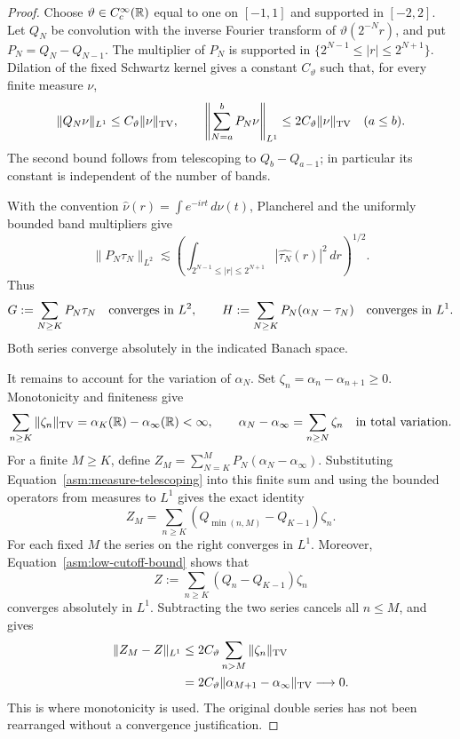 \begin{proof}
Choose $\vartheta\in C_c^\infty(\mathbb R)$ equal to one on $[-1,1]$ and
supported in $[-2,2]$.  Let $Q_N$ be convolution with the inverse
Fourier transform of $\vartheta(2^{-N}r)$, and put
$P_N=Q_N-Q_{N-1}$.  The multiplier of $P_N$ is supported in
$\{2^{N-1}\le|r|\le2^{N+1}\}$.  Dilation of the fixed Schwartz
kernel gives a constant $C_\vartheta$ such that, for every finite
measure $\nu$,
\begin{equation}
 \label{asm:low-cutoff-bound}
 \|Q_N\nu\|_{L^1}\le C_\vartheta\|\nu\|_{\mathrm{TV}},\qquad
 \left\|\sum_{N=a}^bP_N\nu\right\|_{L^1}
 \le2C_\vartheta\|\nu\|_{\mathrm{TV}}\quad(a\le b).
\end{equation}
The second bound follows from telescoping to $Q_b-Q_{a-1}$; in
particular its constant is independent of the number of bands.

With the convention $\widehat\nu(r)=\int e^{-irt}\,d\nu(t)$,
Plancherel \cite[equation~(12.4)]{Mattila1995} and the uniformly
bounded band multipliers give
\[
 \|P_N\tau_N\|_{L^2}
 \lesssim
 \left(\int_{2^{N-1}\le |r|\le2^{N+1}}
                   |\widehat{\tau_N}(r)|^2\,dr\right)^{1/2}.
\]
Thus
\begin{equation}
 \label{asm:two-convergent-series}
 G:=\sum_{N\ge K}P_N\tau_N\quad\hbox{converges in }L^2,
 \qquad
 H:=\sum_{N\ge K}P_N(\alpha_N-\tau_N)
                         \quad\hbox{converges in }L^1.
\end{equation}
Both series converge absolutely in the indicated Banach space.

It remains to account for the variation of $\alpha_N$.  Set
$\zeta_n=\alpha_n-\alpha_{n+1}\ge0$.  Monotonicity and finiteness
give
\begin{equation}
 \label{asm:measure-telescoping}
 \sum_{n\ge K}\|\zeta_n\|_{\mathrm{TV}}
       =\alpha_K(\mathbb R)-\alpha_\infty(\mathbb R)<\infty,
 \qquad
 \alpha_N-\alpha_\infty=\sum_{n\ge N}\zeta_n
                         \quad\hbox{in total variation}.
\end{equation}
For a finite $M\ge K$, define
$Z_M=\sum_{N=K}^MP_N(\alpha_N-\alpha_\infty)$.  Substituting
Equation~\eqref{asm:measure-telescoping} into this finite sum and
using the bounded operators from measures to $L^1$ gives the exact
identity
\begin{equation}
 \label{asm:finite-band-identity}
 Z_M=\sum_{n\ge K}
             (Q_{\min(n,M)}-Q_{K-1})\zeta_n.
\end{equation}
For each fixed $M$ the series on the right converges in $L^1$.
Moreover, Equation~\eqref{asm:low-cutoff-bound} shows that
\[
 Z:=\sum_{n\ge K}(Q_n-Q_{K-1})\zeta_n
\]
converges absolutely in $L^1$.  Subtracting the two series cancels
all $n\le M$, and gives
\begin{equation}
 \label{asm:variation-tail}
 \begin{split}
 \|Z_M-Z\|_{L^1}
 &\le2C_\vartheta\sum_{n>M}\|\zeta_n\|_{\mathrm{TV}}\\
 &=2C_\vartheta
             \|\alpha_{M+1}-\alpha_\infty\|_{\mathrm{TV}}
 \longrightarrow0.
 \end{split}
\end{equation}
This is where monotonicity is used.  The original double series has
not been rearranged without a convergence justification.


\end{proof}
